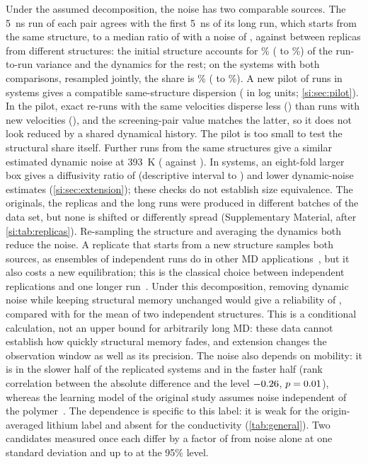 \documentclass[preprint,12pt]{elsarticle}
\begin{document}
Under the assumed decomposition, the noise has two comparable sources. The \SI{5}{\nano\second} run of each pair agrees with the
first \SI{5}{\nano\second} of its long run, which starts from the same structure, to a median
ratio of \techoEndShortPrefRatio{} with a noise of \techoEndSdDyn, against \RepEndSd{} between
replicas from different structures: the initial structure accounts for
\techoEndFracStructPct\% (\techoEndFracStructLo{} to \techoEndFracStructHi\%) of the run-to-run variance
and the dynamics for the rest; on the \techoEndJointN{} systems with both comparisons, resampled
jointly, the share is \techoEndJointFracStructPct\% (\techoEndJointFracStructLo{} to
\techoEndJointFracStructHi\%). A new pilot of \pilRuns{} runs in \pilN{} systems gives a compatible
same-structure dispersion (\pilSdDyn{} in log units; \cref{si:sec:pilot}). In the pilot, exact
re-runs with the same velocities disperse less (\pilSdExact) than runs with new velocities
(\pilSdNewVel), and the screening-pair value \techoEndSdDyn{} matches the latter, so it does not
look reduced by a shared dynamical history. The pilot is too small to test the structural share
itself. Further runs from the same structures give a similar estimated dynamic noise at
\SI{393}{\kelvin} (\ampEndTSdHot{} against \ampEndTSdRef). In \ampBoxN{} systems, an eight-fold
larger box gives a diffusivity ratio of \ampEndBoxRatio{} (descriptive interval
\ampEndBoxRatioLo{} to \ampEndBoxRatioHi) and lower dynamic-noise estimates
(\cref{si:sec:extension}); these checks do not establish size equivalence.
The originals, the replicas and the long runs were produced in
different batches of the data set, but none is shifted or differently spread
(Supplementary Material, after \cref{si:tab:replicas}). Re-sampling the structure and averaging the dynamics both reduce the
noise. A replicate that starts from a new structure samples both sources, as ensembles of
independent runs do in other MD applications~\cite{Coveney2016Ensembles}, but it also costs a new
equilibration; this is the classical choice between independent replications and one longer
run~\cite{Alexopoulos1998Output}. Under this decomposition, removing dynamic noise while keeping structural memory unchanged
would give a reliability of \techoEndOneStructMax{}, compared with \techoEndRelTwo{} for the mean
of two independent structures. This is a conditional calculation, not an upper bound for
arbitrarily long MD: these data cannot establish how quickly structural memory fades, and
extension changes the observation window as well as its precision. The noise
also depends on mobility: it is \techoEndSdSlow{} in the slower half of the replicated systems and
\techoEndSdFast{} in the faster half (rank correlation between the absolute difference and the
level $-0.26$, $p=0.01$), whereas the learning model of the original study assumes
noise independent of the polymer~\cite{Xie2022Accelerating}. The dependence is specific to this
label: it is weak for the origin-averaged lithium label and absent for the conductivity
(\cref{tab:general}). Two candidates measured once each
differ by a factor of \RepEndPairFactor{} from noise alone at one standard deviation and up to
\RepEndPairFactorNinetyFive{} at the 95\% level.
\end{document}
